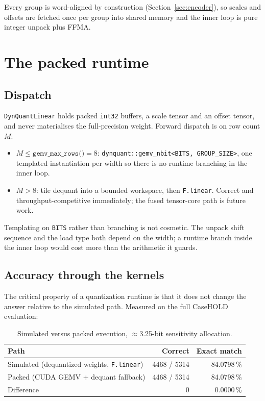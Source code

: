 \documentclass[11pt]{article}
\newcommand{\pct}{\,\%}
\newcommand{\code}[1]{\texttt{#1}}
\begin{document}
Every group is word-aligned by construction (Section~\ref{sec:encoder}), so scales and offsets
are fetched once per group into shared memory and the inner loop is pure integer unpack plus
FFMA.

\section{The packed runtime}
\label{sec:runtime}

\subsection{Dispatch}

\code{DynQuantLinear} holds packed \code{int32} buffers, a scale tensor and an offset tensor, and
never materialises the full-precision weight. Forward dispatch is on row count $M$:

\begin{itemize}
\item $M \le \code{gemv\_max\_rows()} = 8$: \code{dynquant::gemv\_nbit<BITS, GROUP\_SIZE>}, one
templated instantiation per width so there is no runtime branching in the inner loop.
\item $M > 8$: tile dequant into a bounded workspace, then \code{F.linear}. Correct and
throughput-competitive immediately; the fused tensor-core path is future work.
\end{itemize}

Templating on \code{BITS} rather than branching is not cosmetic. The unpack shift sequence and
the load type both depend on the width; a runtime branch inside the inner loop would cost more
than the arithmetic it guards.

\subsection{Accuracy through the kernels}

The critical property of a quantization runtime is that it does not change the answer relative to
the simulated path. Measured on the full CaseHOLD evaluation:

\begin{table}[H]
\centering\small
\caption{Simulated versus packed execution, $\approx$3.25-bit sensitivity allocation.}
\begin{tabular}{lrr}
\toprule
Path & Correct & Exact match \\
\midrule
Simulated (dequantized weights, \code{F.linear}) & 4468 / 5314 & 84.0798\pct \\
\rowcolor{rowtint}
Packed (CUDA GEMV + dequant fallback) & 4468 / 5314 & 84.0798\pct \\
\midrule
Difference & 0 & 0.0000\pct \\
\bottomrule
\end{tabular}
\end{table}
\end{document}
